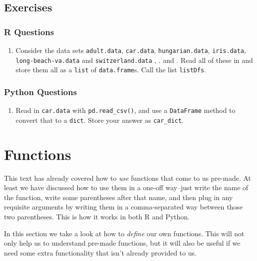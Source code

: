 \documentclass[
  12pt,
  krantz2]{krantz}
\providecommand{\tightlist}{%
  \setlength{\itemsep}{0pt}\setlength{\parskip}{0pt}}
\begin{document}
\hypertarget{exercises-3}{%
\section{Exercises}\label{exercises-3}}

\hypertarget{r-questions-3}{%
\subsection{R Questions}\label{r-questions-3}}

\begin{enumerate}
\def\labelenumi{\arabic{enumi}.}
\tightlist
\item
  Consider the data sets \texttt{adult.data}, \texttt{car.data}, \texttt{hungarian.data}, \texttt{iris.data}, \texttt{long-beach-va.data} and \texttt{switzerland.data} \citep{misc_heart_disease_45}, \citep{misc_iris_53}. \citep{misc_adult_2} and \citep{misc_car_evaluation_19}. Read all of these in and store them all as a \texttt{list} of \texttt{data.frame}s. Call the list \texttt{listDfs}.
\end{enumerate}

\hypertarget{python-questions-3}{%
\subsection{Python Questions}\label{python-questions-3}}

\begin{enumerate}
\def\labelenumi{\arabic{enumi}.}
\tightlist
\item
  Read in \texttt{car.data} with \texttt{pd.read\_csv()}, and use a \texttt{DataFrame} method to convert that to a \texttt{dict}. Store your answer as \texttt{car\_dict}.
\end{enumerate}

\hypertarget{functions}{%
\chapter{Functions}\label{functions}}

This text has already covered how to \emph{use} functions that come to us pre-made. At least we have discussed how to use them in a one-off way--just write the name of the function, write some parentheses after that name, and then plug in any requisite arguments by writing them in a comma-separated way between those two parentheses. This is how it works in both R and Python.

In this section we take a look at how to \emph{define} our own functions. This will not only help us to understand pre-made functions, but it will also be useful if we need some extra functionality that isn't already provided to us.
\end{document}
